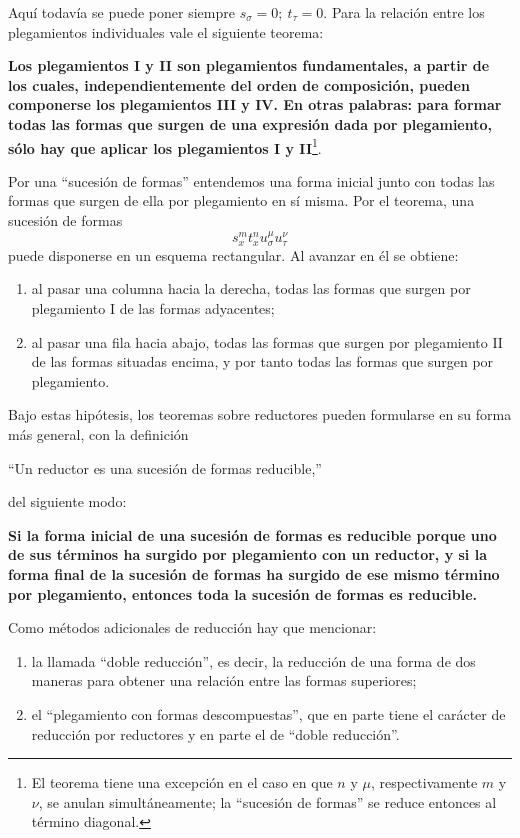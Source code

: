 \documentclass[11pt]{article}
\begin{document}
Aquí todavía se puede poner siempre \(s_\sigma=0;\ t_\tau=0\). Para la relación entre los plegamientos individuales vale el siguiente teorema:

\textbf{Los plegamientos I y II son plegamientos fundamentales, a partir de los cuales, independientemente del orden de composición, pueden componerse los plegamientos III y IV. En otras palabras: para formar todas las formas que surgen de una expresión dada por plegamiento, sólo hay que aplicar los plegamientos I y II}\footnote{El teorema tiene una excepción en el caso en que \(n\) y \(\mu\), respectivamente \(m\) y \(\nu\), se anulan simultáneamente; la ``sucesión de formas'' se reduce entonces al término diagonal.}.

Por una ``sucesión de formas'' entendemos una forma inicial junto con todas las formas que surgen de ella por plegamiento en sí misma. Por el teorema, una sucesión de formas
\[
s_x^m t_x^n u_\sigma^\mu u_\tau^\nu
\]
puede disponerse en un esquema rectangular. Al avanzar en él se obtiene:
\begin{enumerate}
\item al pasar una columna hacia la derecha, todas las formas que surgen por plegamiento I de las formas adyacentes;
\item al pasar una fila hacia abajo, todas las formas que surgen por plegamiento II de las formas situadas encima, y por tanto todas las formas que surgen por plegamiento.
\end{enumerate}

Bajo estas hipótesis, los teoremas sobre reductores pueden formularse en su forma más general, con la definición
\begin{center}
``Un reductor es una sucesión de formas reducible,''
\end{center}
del siguiente modo:

\begin{center}
\textbf{Si la forma inicial de una sucesión de formas es reducible porque uno de sus términos ha surgido por plegamiento con un reductor, y si la forma final de la sucesión de formas ha surgido de ese mismo término por plegamiento, entonces toda la sucesión de formas es reducible.}
\end{center}

Como métodos adicionales de reducción hay que mencionar:
\begin{enumerate}
\item la llamada ``doble reducción'', es decir, la reducción de una forma de dos maneras para obtener una relación entre las formas superiores;
\item el ``plegamiento con formas descompuestas'', que en parte tiene el carácter de reducción por reductores y en parte el de ``doble reducción''.
\end{enumerate}
\end{document}
